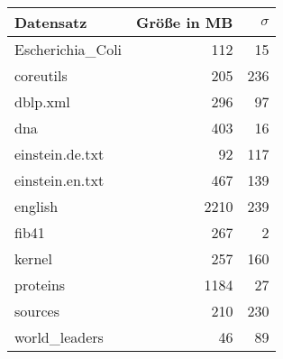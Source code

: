 \documentclass[10pt,a4paper]{standalone}
\begin{document}
	
	\begin{tabular}{|l||r|r|}
		\hline
		Datensatz & Größe in MB & $\sigma$ \\ \hline\hline
  Escherichia\_Coli &  112 &  15 \\
          coreutils &  205 & 236 \\
           dblp.xml &  296 &  97 \\
                dna &  403 &  16 \\
    einstein.de.txt &   92 & 117 \\
    einstein.en.txt &  467 & 139 \\
            english & 2210 & 239 \\
              fib41 &  267 &   2 \\
             kernel &  257 & 160 \\
           proteins & 1184 &  27 \\
            sources &  210 & 230 \\
     world\_leaders &   46 &  89 \\
  		\hline
	\end{tabular}
    
\end{document}
